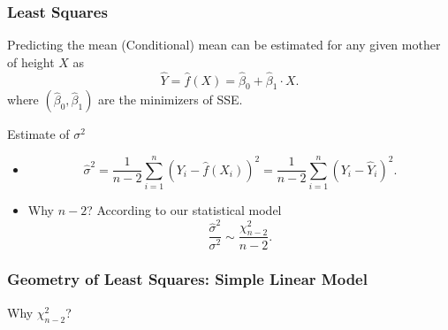 \documentclass[handout]{beamer}
\begin{document}

   \begin{frame} \frametitle{Least Squares}

   \begin{block}
   {Predicting the mean}
   (Conditional) mean can be estimated for any given mother of height $X$ as
   $$
   \widehat{Y} = \widehat{f}(X) = \widehat{\beta}_0 + \widehat{\beta}_1 \cdot X.$$
   where $(\widehat{\beta}_0, \widehat{\beta}_1)$ are the minimizers of SSE.
   \end{block}

   \begin{block}
   {Estimate of $\sigma^2$}
   \begin{itemize}


   \item
   $$
   \widehat{\sigma}^2 = \frac{1}{n-2} \sum_{i=1}^n \left(Y_i - \widehat{f}(X_i)\right)^2 = \frac{1}{n-2} \sum_{i=1}^n \left(Y_i - \widehat{Y}_i\right)^2.$$
   \item Why $n-2$? According to our statistical model
   $$
   \frac{\widehat{\sigma}^2}{\sigma^2} \sim \frac{\chi^2_{n-2}}{n-2}.$$
   \end{itemize}
   \end{block}
   \end{frame}


   \begin{frame} \frametitle{Geometry of Least Squares: Simple Linear Model}


   \begin{center}
   Why $\chi^2_{n-2}$?
   \end{center}
   \end{frame}

\end{document}
